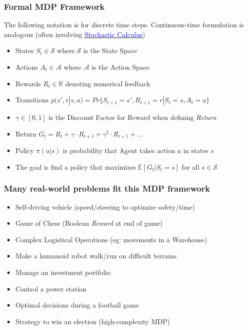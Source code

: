 \documentclass[handout]{beamer}
\begin{document}
\begin{frame}
\frametitle{Formal MDP Framework}
\pause
The following notation is for discrete time steps. Continuous-time formulation is analogous (often involving
\href{https://github.com/coverdrive/technical-documents/blob/master/finance/cme241/StochasticCalculusFoundations.pdf}{\underline{\textcolor{blue}{Stochastic Calculus}}})
\begin{itemize}[<+->]
\item States $S_t \in \mathcal{S}$ where $\mathcal{S}$ is the State Space
\item Actions $A_t \in \mathcal{A}$ where $\mathcal{A}$ is the Action Space
\item Rewards $R_t \in \mathbb{R}$ denoting numerical feedback\
\item Transitions $p(s',r|s,a) = Pr\{S_{t+1}=s',R_{t+1}=r|S_t=s,A_t=a\}$
\item $\gamma \in [0,1]$ is the Discount Factor for Reward when defining {\em Return}
\item Return $G_t = R_t + \gamma \cdot R_{t+1} + \gamma^2 \cdot R_{t+1} + \ldots$
\item Policy $\pi(a|s)$ is probability that Agent takes action $a$ in states $s$
\item The goal is find a policy that maximizes  $\mathbb{E}[G_t|S_t = s]$ for all $s \in \mathcal{S}$
\end{itemize}
\end{frame}

\begin{frame}
\frametitle{Many real-world problems fit this MDP framework}
\pause
\begin{itemize}
\item Self-driving vehicle (speed/steering to optimize safety/time)
\item Game of Chess (Boolean {\em Reward} at end of game)
\item Complex Logistical Operations (eg: movements in a Warehouse)
\item Make a humanoid robot walk/run on difficult terrains
\item Manage an investment portfolio
\item Control a power station
\item Optimal decisions during a football game
\item Strategy to win an election (high-complexity MDP)
\end{itemize}
\end{frame}
\end{document}

